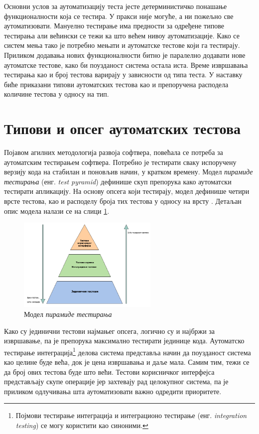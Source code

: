 \documentclass[12pt,oneside]{memoir}
\begin{document}
Основни услов за аутоматизацију теста јесте детерминистичко понашање функционалности која се тестира. У пракси није могуће, а ни пожељно све аутоматизовати. Мануелно тестирање има предности за одређене типове тестирања али већински се тежи ка што већем нивоу аутоматизације. Како се систем мења тако је потребно мењати и аутоматске тестове који га тестирају. Приликом додавања нових функционалности битно је паралелно додавати нове аутоматске тестове, како би поузданост система остала иста. Време извршавања тестирања као и број тестова варирају у зависности од типа теста. У наставку биће приказани типови аутоматских тестова као и препоручена расподела количине тестова у односу на тип.


\section{Типови и опсег аутоматских тестова}

Појавом агилних методологија развоја софтвера, повећала се потреба за аутоматским тестирањем софтвера. Потребно је тестирати сваку испоручену верзију кода на стабилан и поновљив начин, у кратком времену. Модел \textit{пирамиде тестирања} (енг. \textit{test pyramid}) дефинише скуп препорука како аутоматски тестирати апликацију. На основу опсега који тестирају, модел дефинише четири врсте тестова, као и расподелу броја тих тестова у односу на врсту \cite{microservicesBook}. 
Детаљан опис модела налази се на слици \ref{fig:piramida}.

\begin{figure}[!ht]
  \centering
  \includegraphics[width=0.6\textwidth]{matfmaster/img/piramida.png}
  \caption{Модел \textit{пирамиде тестирања}}
  \label{fig:piramida}
\end{figure}

Како су јединични тестови најмањег опсега, логично су и најбржи за извршавање, па је препорука максимално тестирати јединице кода. Аутоматско тестирање интеграција\footnote{Појмови тестирање интеграција и интеграционо тестирање (енг. \textit{integration testing}) се могу користити као синоними.} делова система представља начин да поузданост система као целине буде већа, док је цена извршавања и даље мала. Самим тим, тежи се да број ових тестова буде што већи. Тестови корисничког интерфејса представљају скупе операције јер захтевају рад целокупног система, па је приликом одлучивања шта аутоматизовати важно одредити приоритете.
\end{document}
